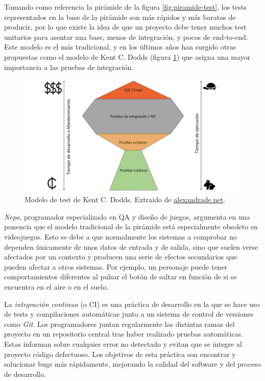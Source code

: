 Tomando como referencia la pirámide de la figura \ref{fig:piramide-test}, los tests representados en la base de la pirámide son más rápidos y más baratos de producir, por lo que existe la idea de que un proyecto debe tener muchos test unitarios para asentar una base, menos de integración, y pocos de end-to-end. Este modelo es el más tradicional, y en los últimos años han surgido otras propuestas como el modelo de Kent C. Dodds (figura \ref{fig:piramide-test-2}) que asigna una mayor importancia a las pruebas de integración.

\begin{figure}[h]
    \centering
    \includegraphics[scale=0.4]{img/piramide-2.png}
    \caption[Modelo de test de Kent C. Dodds]{Modelo de test de Kent C. Dodds. Extraido de \href{https://alexandrade.net/blog-de-ingenieria-de-software/calidad-de-software/pruebas-de-integracion-adios-a-la-piramide-de-pruebas/}{alexandrade.net}.}
    \label{fig:piramide-test-2}
\end{figure}

\textit{Nepo}, programador especializado en QA y diseño de juegos, argumenta en una ponencia\cite{nepo} que el modelo tradicional de la pirámide está especialmente obsoleto en videojuegos. Esto se debe a que normalmente los sistemas a comprobar no dependen únicamente de unos datos de entrada y de salida, sino que suelen verse afectados por un contexto y producen una serie de efectos secundarios que pueden afectar a otros sistemas. Por ejemplo, un personaje puede tener comportamientos diferentes al pulsar el botón de saltar en función de si se encuentra en el aire o en el suelo.

La \textit{integración continua} (o CI) es una práctica de desarrollo en la que se hace uso de tests y compilaciones automáticas junto a un sistema de control de versiones como \textit{Git}. Los programadores juntan regularmente las distintas ramas del proyecto en un repositorio central tras haber realizado pruebas automáticas. Estas informan sobre cualquier error no detectado y evitan que se integre al proyecto código defectuoso. Los objetivos de esta práctica son encontrar y solucionar bugs más rápidamente, mejorando la calidad del software y del proceso de desarrollo.

